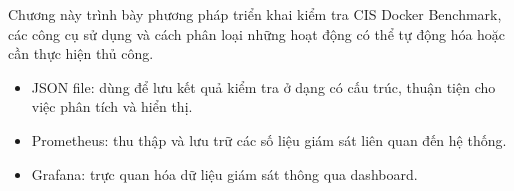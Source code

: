 \label{chuong-3-phuong-phap-thuc-hien}

Chương này trình bày phương pháp triển khai kiểm tra CIS Docker Benchmark, các công cụ sử dụng và cách phân loại những hoạt động có thể tự động hóa hoặc cần thực hiện thủ công.

\begin{itemize}
\item
  JSON file: dùng để lưu kết quả kiểm tra ở dạng có cấu trúc, thuận tiện cho việc phân tích và hiển thị.
\item
  Prometheus: thu thập và lưu trữ các số liệu giám sát liên quan đến hệ thống.
\item
  Grafana: trực quan hóa dữ liệu giám sát thông qua dashboard.
\end{itemize}

